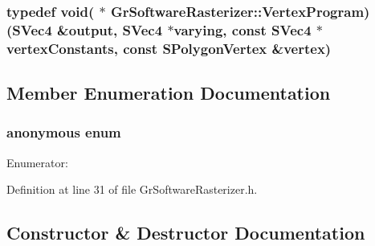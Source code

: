 \begin{CompactItemize}
\hypertarget{class_gr_software_rasterizer_04030d2fb613d917866570b1150e208b}{
\subsubsection[{VertexProgram}]{\setlength{\rightskip}{0pt plus 5cm}typedef void( $\ast$ {\bf GrSoftwareRasterizer::VertexProgram})({\bf SVec4} \&output, {\bf SVec4} $\ast$varying, const {\bf SVec4} $\ast$vertexConstants, const {\bf SPolygonVertex} \&vertex)}}
\label{class_gr_software_rasterizer_04030d2fb613d917866570b1150e208b}




\subsection{Member Enumeration Documentation}
\hypertarget{class_gr_software_rasterizer_b42d432567917cc2b4bc57cd96e5d7e3}{
\subsubsection[{"@7}]{\setlength{\rightskip}{0pt plus 5cm}anonymous enum}}
\label{class_gr_software_rasterizer_b42d432567917cc2b4bc57cd96e5d7e3}


\begin{Desc}
\item[Enumerator: ]\par
\begin{description}
\item[{\em 
\hypertarget{class_gr_software_rasterizer_b42d432567917cc2b4bc57cd96e5d7e349dc9744965746cb773cd7f159cb304d}{
MAX\_\-RENDER\_\-TARGET\_\-COUNT}
\label{class_gr_software_rasterizer_b42d432567917cc2b4bc57cd96e5d7e349dc9744965746cb773cd7f159cb304d}
}]\end{description}
\end{Desc}



Definition at line 31 of file GrSoftwareRasterizer.h.

\subsection{Constructor \& Destructor Documentation}
\hypertarget{class_gr_software_rasterizer_4152bc0ee54f65d67451793cace04326}{
}
\end{CompactItemize}
